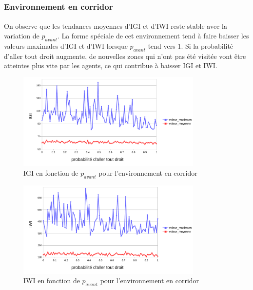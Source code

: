 \documentclass{article}
\begin{document}
    \subsubsection{Environnement en corridor}
    \paragraph{}On observe que les tendances moyennes d'IGI et d'IWI reste stable avec la variation de $p_{avant}$. La forme spéciale de cet environnement tend à faire baisser les valeurs maximales d'IGI et d'IWI lorsque $p_{avant}$ tend  vers 1.
    Si la probabilité d'aller tout droit augmente, de nouvelles zones qui n'ont pas été visitée vont être atteintes plus vite par les agents, ce qui contribue à baisser IGI et IWI.
    \begin{figure}[!h]
        \begin{center}
            \includegraphics[width = 0.82\textwidth]{graphes pdf/variance go-ahead IGI corridor.pdf}
            \caption{IGI en fonction de $p_{avant}$ pour l'environnement en corridor}
        \end{center}
    \end{figure}
    \begin{figure}[!h]
        \begin{center}
            \includegraphics[width = 0.82\textwidth]{graphes pdf/variance go-ahead IWI corridor.pdf}
            \caption{IWI en fonction de $p_{avant}$ pour l'environnement en corridor}
        \end{center}
    \end{figure}
    \newpage
\end{document}

